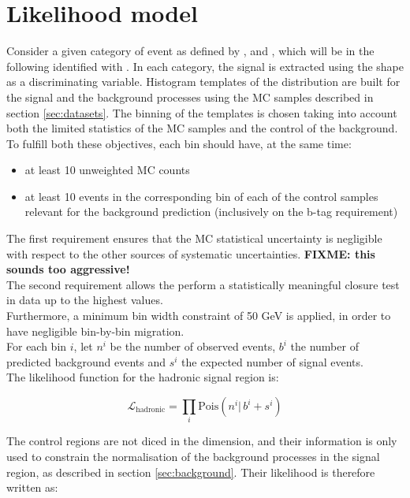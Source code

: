 \section{Likelihood model}
\label{sec:likelihood}

Consider a given category of event as defined by \njet, \nb and \HT, which will be in the following identified with \htcat. 
In each category, the signal is extracted using the \mht shape as a discriminating variable. 
Histogram templates of the \mht distribution are built for the signal and the background processes 
using the MC samples described in section \ref{sec:datasets}. 
The binning of the templates is chosen taking into account both the limited statistics of the MC samples and 
the control of the background. To fulfill both these objectives, each bin should have, at the same time:
\begin{itemize}
\item at least 10 unweighted MC counts
\item at least 10 events in the corresponding bin of each of the control samples relevant for the background prediction (inclusively on the b-tag requirement)
\end{itemize}

The first requirement ensures that the MC statistical uncertainty is negligible with respect to the other sources of systematic uncertainties. \textbf{FIXME: this sounds too aggressive!} \\
The second requirement allows the perform a statistically meaningful closure test in data up to the highest \mht values. \\
Furthermore, a minimum bin width constraint of 50 GeV is applied, in order to have negligible bin-by-bin migration. \\ 

For each \mht bin $i$, let $n^{i}$ be the number of observed events, $b^{i}$ the number of predicted 
background events and $s^{i}$ the expected number of signal events. \\
The likelihood function for the hadronic signal region is:

\begin{equation}
\mathcal{L}_{\mathrm{hadronic}}=\prod_i \mathrm{Pois}(n^i |\, b^i + s^i)
\label{eq:hadronicLikelihood}
\end{equation}

The control regions are not diced in the \mht dimension, and their information is only used to constrain the normalisation of the background processes 
in the signal region, as described in section \ref{sec:background}. 
Their likelihood is therefore written as:

